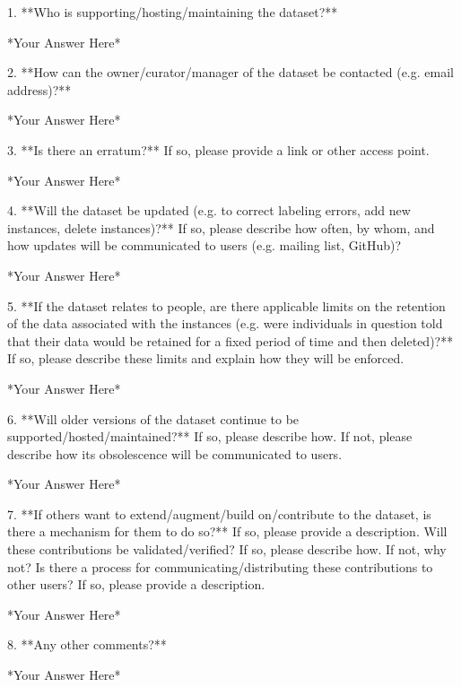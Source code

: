 1. **Who is supporting/hosting/maintaining the dataset?**

	*Your Answer Here*

2. **How can the owner/curator/manager of the dataset be contacted (e.g. email address)?**

	*Your Answer Here*

3. **Is there an erratum?** If so, please provide a link or other access point.

	*Your Answer Here*

4. **Will the dataset be updated (e.g. to correct labeling errors, add new instances, delete instances)?** If so, please describe how often, by whom, and how updates will be communicated to users (e.g. mailing list, GitHub)?

	*Your Answer Here*

5. **If the dataset relates to people, are there applicable limits on the retention of the data associated with the instances (e.g. were individuals in question told that their data would be retained for a fixed period of time and then deleted)?** If so, please describe these limits and explain how they will be enforced.

	*Your Answer Here*

6. **Will older versions of the dataset continue to be supported/hosted/maintained?** If so, please describe how. If not, please describe how its obsolescence will be communicated to users.

	*Your Answer Here*

7. **If others want to extend/augment/build on/contribute to the dataset, is there a mechanism for them to do so?** If so, please provide a description. Will these contributions be validated/verified? If so, please describe how. If not, why not? Is there a process for communicating/distributing these contributions to other users? If so, please provide a description.

	*Your Answer Here*

8. **Any other comments?**

	*Your Answer Here*